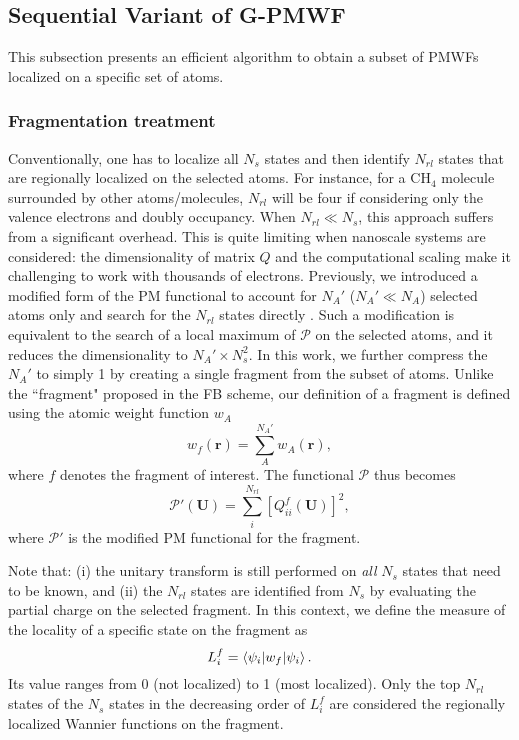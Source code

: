 \documentclass[journal=jacsat,manuscript=article]{achemso}
\begin{document}
\subsection{Sequential Variant of G-PMWF}

This subsection presents an efficient algorithm to obtain a subset of PMWFs localized on a specific set of atoms.

\subsubsection{Fragmentation treatment}
Conventionally, one has to localize all $N_{s}$ states and then identify $N_{rl}$ states that are regionally localized on the selected atoms. For instance, for a $\text{CH}_4$ molecule surrounded by other atoms/molecules, $N_{rl}$ will be four if considering only the valence electrons and doubly occupancy.
When $N_{rl}\ll N_{s}$, this approach suffers from a significant overhead. This is quite limiting when nanoscale systems are considered: the dimensionality of matrix $Q$ and the computational scaling make it challenging to work with thousands of electrons. Previously, we introduced a modified form of the PM functional to account for $N_A'$ ($N_A'\ll N_A$) selected atoms only and search for the $N_{rl}$ states directly\cite{Weng2021} . Such a modification is equivalent to the search of a local maximum of $\mathcal{P}$ on the selected atoms, and it reduces the dimensionality to $N_A'\times N_{s}^2$. In this work, we further compress the $N_A'$ to simply 1 by creating a single fragment from the subset of atoms. Unlike the ``fragment" proposed in the FB scheme\cite{Zhang2014}, our definition of a fragment is defined using the atomic weight function $w_A$
\begin{equation}\label{eq:fwf}
w_f(\textbf{r}) = \sum_A^{N_A'} w_A(\textbf{r}),
\end{equation}
where $f$ denotes the fragment of interest. The functional $\mathcal{P}$ thus becomes
\begin{equation}\label{eq:Pprime}
\mathcal{P'(\textbf{U})} = \sum_i^{N_{rl}}[Q_{ii}^f(\textbf{U})]^2,
\end{equation}
where $\mathcal{P}'$ is the modified PM functional for the fragment. 

Note that: (i) the unitary transform is still performed on \textit{all} $N_{s}$ states that need to be known, and (ii) the $N_{rl}$ states are identified from $N_s$ by evaluating the partial charge on the selected fragment. In this context, we define the measure of the locality of a specific state on the fragment as
\begin{equation}\label{eq:localityfrag}
L^f_i = \braket{\psi_i|w_f|\psi_i}.
\end{equation}
Its value ranges from 0 (not localized) to 1 (most localized). Only the top $N_{rl}$ states of the $N_{s}$ states in the decreasing order of $L^f_i$ are considered the regionally localized Wannier functions on the fragment.
\end{document}
